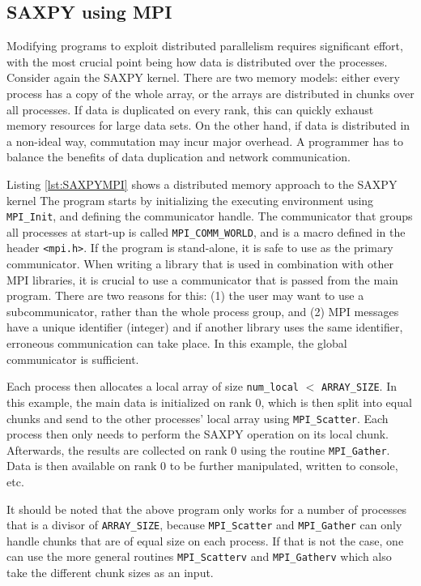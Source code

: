 \subsection{SAXPY using MPI}

Modifying programs to exploit distributed parallelism requires significant effort, with the most crucial point being how data is distributed over the processes. Consider again the SAXPY kernel. There are two memory models: either every process has a copy of the whole array, or the arrays are distributed in chunks over all processes. If data is duplicated on every rank, this can quickly exhaust memory resources for large data sets. On the other hand, if data is distributed in a non-ideal way, commutation may incur major overhead. A programmer has to balance the benefits of data duplication and network communication. 

Listing \ref{lst:SAXPYMPI} shows a distributed memory approach to the SAXPY kernel
\noindent The program starts by initializing the executing environment using \texttt{MPI{\_}Init}, and defining the communicator handle. The communicator that groups all processes at start-up is called \texttt{MPI{\_}COMM{\_}WORLD}, and is a macro defined in the header \texttt{<mpi.h>}. If the program is stand-alone, it is safe to use as the primary communicator. When writing a library that is used in combination with other MPI libraries, it is crucial to use a communicator that is passed from the main program. There are two reasons for this: (1) the user may want to use a subcommunicator, rather than the whole process group, and (2) MPI messages have a unique identifier (integer) and if another library uses the same identifier, erroneous communication can take place. In this example, the global communicator is sufficient.

Each process then allocates a local array of size \texttt{num{\_}local} $<$ \texttt{ARRAY{\_}SIZE}. In this example, the main data is initialized on rank 0, which is then split into equal chunks and send to the other processes' local array using \texttt{MPI{\_}Scatter}. Each process then only needs to perform the SAXPY operation on its local chunk. Afterwards, the results are collected on rank 0 using the routine \texttt{MPI{\_}Gather}. Data is then available on rank 0 to be further manipulated, written to console, etc. 

It should be noted that the above program only works for a number of processes that is a divisor of \texttt{ARRAY{\_}SIZE}, because \texttt{MPI{\_}Scatter} and \texttt{MPI{\_}Gather} can only handle chunks that are of equal size on each process. If that is not the case, one can use the more general routines \texttt{MPI{\_}Scatterv} and \texttt{MPI{\_}Gatherv} which also take the different chunk sizes as an input.

